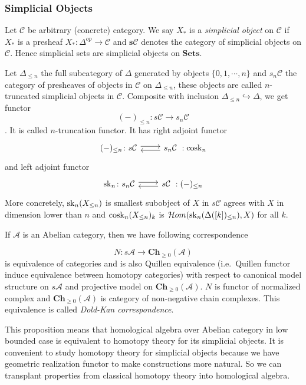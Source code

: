 \documentclass[b5paper,10pt]{article}
\begin{document}
\subsubsection{Simplicial Objects}
Let $\mathcal{C}$ be arbitrary (concrete) category. We say $X_*$ is a \emph{simplicial object} on $\mathcal{C}$ if $X_*$ is a presheaf $X_* \colon \Delta^{op} \to \mathcal{C}$ and $\mathbf{s}\mathcal{C}$ denotes the category of simplicial objects on $\mathcal{C}$. Hence simplicial sets are simplicial objects on $\mathbf{Sets}$. 

Let $\Delta_{\leq n}$ the full subcategory of $\Delta$ generated by objects $\{0,1, \cdots, n \}$ and $s_n \mathcal{C}$ the category of presheaves of objects in $\mathcal{C}$ on $\Delta_{\leq n}$, these objects are called $n$-truncated simplicial objects in $\mathcal{C}$. Composite with inclusion $\Delta_{\leq n} \hookrightarrow \Delta$, we get functor
\[
(-)_{\leq n} \colon s\mathcal{C} \to s_n \mathcal{C}
\]
. It is called $n$-truncation functor. It has right adjoint functor 
\[
\begin{tikzcd}
(-)_{\leq n} \colon s\mathcal{C} \ar[r, shift left = 1] \ar[r, leftarrow, shift right =1]& s_n \mathcal{C}\ :\cosk_n
\end{tikzcd}
\]
and left adjoint functor 
\[
\begin{tikzcd}
\sk_n \colon s_n\mathcal{C} \arrow[r, shift left =1] \arrow[r, leftarrow, shift right=1]& s\mathcal{C}\ : (-)_{\leq n}
\end{tikzcd}
\]
More concretely, $\operatorname{sk}_n(X_{\leq n})$ is smallest subobject of $X$ in $s\mathcal{C}$ agrees with $X$ in dimension lower than $n$ and $\operatorname{cosk}_n(X_{\leq n})_k$ is $\mathcal{H}om(\operatorname{sk}_n(\Delta([k])_{\leq n}),X) $ for all $k$.

If $\mathcal{A}$ is  an Abelian category, then we have following correspondence
\begin{secprop}
\[
N \colon s\mathcal{A} \to \mathbf{Ch}_{\geq 0} (\mathcal{A})
\]
is equivalence of categories and is also Quillen equivalence (i.e.\ Quillen functor induce equivalence between homotopy categories) with respect to canonical model structure on $s\mathcal{A}$ and projective model on $\mathbf{Ch}_{\geq 0 } (\mathcal{A})$. $N$ is functor of normalized complex and $\mathbf{Ch}_{\geq 0}(\mathcal{A})$ is category of non-negative chain complexes. This equivalence is called \emph{Dold-Kan correspondence}.
\end{secprop}
This proposition means that homological algebra over Abelian category in low bounded case is equivalent to homotopy theory for its simplicial objects. It is convenient to study homotopy theory for simplicial objects because we have geometric realization functor to make constructions more natural. So we can transplant properties from classical homotopy theory into homological algebra.
\end{document}
